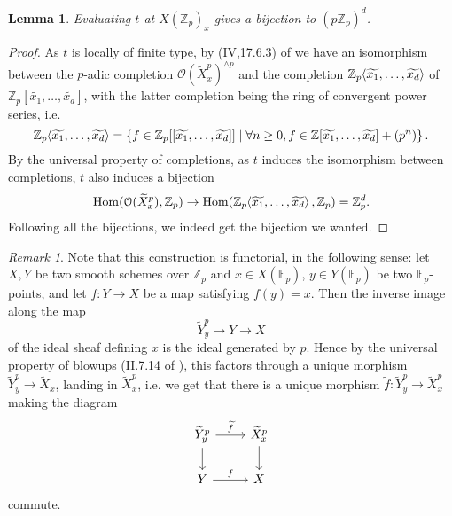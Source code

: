 \documentclass[12pt]{article}
\newcommand{\Z}{\mathbb{Z}}
\renewcommand{\O}{\mathcal{O}}
\newcommand{\F}{\mathbb{F}}
\renewcommand{\angle}[1]{\hspace{-2pt}\left\langle #1 \right\rangle}
\DeclareMathOperator{\Hom}{Hom}
\theoremstyle{plain}
\newtheorem{lem}[thm]{Lemma} %
\theoremstyle{definition}
\theoremstyle{remark}
\newtheorem{rem}[thm]{Remark} %
\begin{document}
\begin{lem}
Evaluating $t$ at $X(\Z_p)_x$ gives a bijection to $(p\Z_p)^d$.
\end{lem}
\begin{proof}
As $t$ is locally of finite type, by (IV,17.6.3) of \cite{ega} we have an isomorphism between the $p$-adic completion $\O(\widetilde{X}_x^p)^{\wedge p}$ and the completion $\Z_p\angle{\widetilde{x_1},\dots, \widetilde{x_d}}$ of $\Z_p[\widetilde{x_1},\dots,\widetilde{x_d}]$, with the latter completion being the ring of convergent power series, i.e.
\[
\Z_p\angle{\widetilde{x_1},\dots, \widetilde{x_d}} = \left\{f \in \Z_p[[\widetilde{x_1},\dots,\widetilde{x_d}]] \mid \forall n \geq 0, f \in \Z[\widetilde{x_1},\dots,\widetilde{x_d}] + (p^n) \right\}.
\]
By the universal property of completions, as $t$ induces the isomorphism between completions, $t$ also induces a bijection $$\Hom(\O(\widetilde{X}_x^p), \Z_p) \to \Hom(\Z_p\angle{\widetilde{x_1},\dots,\widetilde{x_d}},\Z_p) = \Z_p^d.$$ Following all the bijections, we indeed get the bijection we wanted.
\end{proof}

\begin{rem}
\label{rem:smoothpointsfunc}
Note that this construction is functorial, in the following sense: let $X,Y$ be two smooth schemes over $\Z_p$ and $x\in X(\F_p)$, $y\in Y(\F_p)$ be two $\F_p$-points, and let $f: Y \to X$ be a map satisfying $f(y) = x$. Then the inverse image along the map\[\widetilde{Y}_y^p \to Y \to X\] of the ideal sheaf defining $x$ is the ideal generated by $p$. Hence by the universal property of blowups (II.7.14 of \cite{hartshorne}), this factors through a unique morphism $\widetilde{Y}_y^p \to \widetilde{X}_x$, landing in $\widetilde{X}_x^p$, i.e. we get that there is a unique morphism $\widetilde{f}: \widetilde{Y}_y^p \to \widetilde{X}_x^p$ making the diagram
\[
\begin{tikzcd}
\widetilde{Y}_y^p \arrow[d] \arrow[r,"\widetilde{f}"] & \widetilde{X}_x^p \arrow[d] \\
Y \arrow[r,"f"]              & X  
\end{tikzcd}
\]
commute.
\end{rem}
\end{document}
